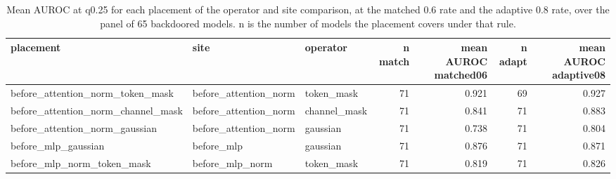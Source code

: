 \begin{table}[htbp]
\centering
\small
\caption{Mean AUROC at q0.25 for each placement of the operator and site comparison, at the matched 0.6 rate and the adaptive 0.8 rate, over the panel of 65 backdoored models. n is the number of models the placement covers under that rule.}
\label{tab:operators}
\begin{adjustbox}{max width=\linewidth}
\begin{tabular}{lllrrrr}
\toprule
placement & site & operator & n match & mean AUROC matched06 & n adapt & mean AUROC adaptive08 \\
\midrule
before\_attention\_norm\_token\_mask & before\_attention\_norm & token\_mask & 71 & 0.921 & 69 & 0.927 \\
before\_attention\_norm\_channel\_mask & before\_attention\_norm & channel\_mask & 71 & 0.841 & 71 & 0.883 \\
before\_attention\_norm\_gaussian & before\_attention\_norm & gaussian & 71 & 0.738 & 71 & 0.804 \\
before\_mlp\_gaussian & before\_mlp & gaussian & 71 & 0.876 & 71 & 0.871 \\
before\_mlp\_norm\_token\_mask & before\_mlp\_norm & token\_mask & 71 & 0.819 & 71 & 0.826 \\
\bottomrule
\end{tabular}
\end{adjustbox}
\end{table}
